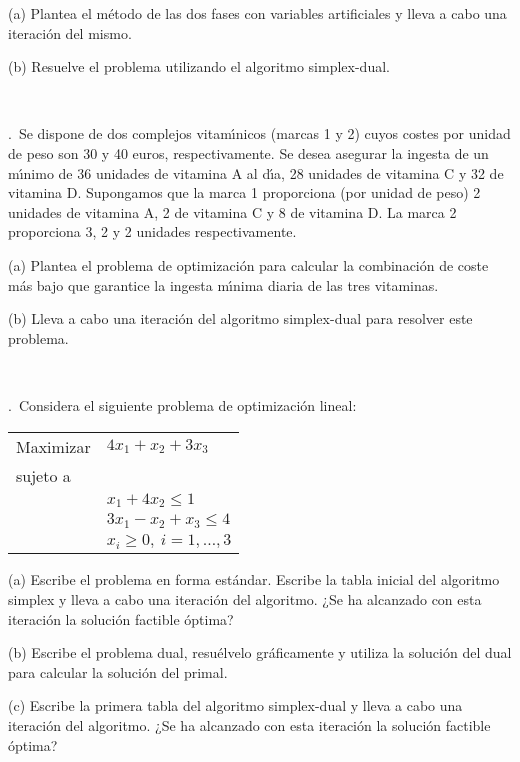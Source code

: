 \documentclass[12pt,a4paper,twoside]{article}
\newcounter{problem} \setcounter{problem}{1}
\newcommand{\ex}{\noindent {\sf \bf \theproblem}\addtocounter{problem}{1}.\ }
\begin{document}
\begin{compactitem}
\item[(a)] Plantea el método de las dos fases con variables artificiales
y lleva a cabo una iteración del mismo.
\item[(b)] Resuelve el problema utilizando el algoritmo simplex-dual. 
\end{compactitem}




\

\ex Se dispone de dos complejos vitam\'{\i}nicos (marcas 1 y 2)
cuyos costes por unidad de peso son 30 y 40 euros,
respectivamente. Se desea asegurar la ingesta de un m\'{\i}nimo de 36
unidades de vitamina A al d\'{\i}a, 28 unidades de vitamina C y 32 de
vitamina D. Supongamos que la marca 1 proporciona (por unidad de
peso) 2 unidades de vitamina A, 2 de vitamina C y 8 de vitamina D.
La marca 2 proporciona 3, 2 y 2 unidades respectivamente.

\begin{compactitem}
\item[(a)] Plantea el problema de optimizaci\'on para calcular la
combinaci\'on de coste m\'as bajo que garantice la ingesta m\'{\i}nima
diaria de las tres vitaminas.
\item[(b)] Lleva a cabo una iteraci\'on del algoritmo simplex-dual para resolver este
problema.
\end{compactitem}





\


\ex Considera el siguiente problema de optimización lineal:

\begin{center}
\begin{tabular}{ll}
Maximizar & $4x_1 + x_2 + 3x_3$ \\
sujeto a & \\
& $x_1 + 4x_2 \leq 1 $\\
& $3x_1 - x_2 + x_3 \leq 4$\\
&$x_i\geq 0,\ i=1,\ldots,3$
\end{tabular}
\end{center}

\begin{compactitem}
\item[(a)] Escribe el problema en forma estándar. Escribe la tabla inicial del algoritmo simplex y lleva a cabo una iteración del algoritmo. ¿Se ha alcanzado con esta iteración la solución factible óptima?
\item[(b)] Escribe el problema dual, resuélvelo gráficamente y utiliza la solución del dual para calcular la solución del primal. 
\item[(c)] Escribe la primera tabla del algoritmo simplex-dual y lleva a cabo una iteración del algoritmo. ¿Se ha alcanzado con esta iteración la solución factible óptima?
\end{compactitem}
\end{document}

